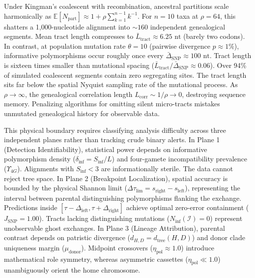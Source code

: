 Under Kingman's coalescent with recombination, ancestral partitions scale harmonically as $\mathbb{E}[N_{\text{part}}] \approx 1 + \rho \sum_{k=1}^{n-1} k^{-1}$.
For $n=10$ taxa at $\rho=64$, this shatters a 1,000-nucleotide alignment into $\sim 160$ independent genealogical segments.
Mean tract length compresses to $\bar{L}_{\text{tract}} \approx 6.25\text{ nt}$ (barely two codons).
In contrast, at population mutation rate $\theta = 10$ (pairwise divergence $p \approx 1\%$), informative polymorphisms occur roughly once every $\bar{\Delta}_{\text{SNP}} \approx 100\text{ nt}$.
Tract length is sixteen times smaller than mutational spacing ($\bar{L}_{\text{tract}} / \bar{\Delta}_{\text{SNP}} \approx 0.06$).
Over 94\% of simulated coalescent segments contain zero segregating sites.
The tract length sits far below the spatial Nyquist sampling rate of the mutational process.
As $\rho \to \infty$, the genealogical correlation length $L_{\text{corr}} \sim 1/\rho \to 0$, destroying sequence memory.
Penalizing algorithms for omitting silent micro-tracts mistakes unmutated genealogical history for observable data.

This physical boundary requires classifying analysis difficulty across three independent planes rather than tracking crude binary alerts.
In Plane 1 (Detection Identifiability), statistical power depends on informative polymorphism density ($\delta_{\text{inf}} = S_{\text{inf}} / L$) and four-gamete incompatibility prevalence ($\Upsilon_{4G}$).
Alignments with $S_{\text{inf}} < 3$ are informationally sterile.
The data cannot reject tree space.
In Plane 2 (Breakpoint Localization), spatial accuracy is bounded by the physical Shannon limit ($\Delta \tau_{\text{lim}} = s_{\text{right}} - s_{\text{left}}$), representing the interval between parental distinguishing polymorphisms flanking the exchange.
Predictions inside $[\tau - \Delta_{\text{left}}, \tau + \Delta_{\text{right}}]$ achieve optimal zero-error containment ($J_{\text{SNP}} = 1.00$).
Tracts lacking distinguishing mutations ($N_{\text{inf}}(\mathcal{I}) = 0$) represent unobservable ghost exchanges.
In Plane 3 (Lineage Attribution), parental contrast depends on patristic divergence ($d_{H, D} = d_{\text{tree}}(H, D)$) and donor clade uniqueness margin ($\mu_{\text{donor}}$).
Midpoint crossovers ($\eta_{\text{pol}} \approx 1.0$) introduce mathematical role symmetry, whereas asymmetric cassettes ($\eta_{\text{pol}} \ll 1.0$) unambiguously orient the home chromosome.

